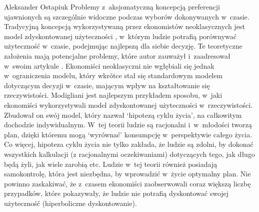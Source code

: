\begin{artplenv}{Aleksander Ostapiuk}
Problemy z~aksjomatyczną koncepcją preferencji ujawnionych są szczególnie widoczne podczas wyborów
dokonywanych w~czasie. Tradycyjną koncepcją wykorzystywaną przez ekonomistów neoklasycznych jest model zdyskontowanej użyteczności
\parencite{samuelson_note_1937},
w~którym ludzie potrafią porównywać użyteczność w~czasie, podejmując
najlepszą dla siebie decyzję. Te teoretyczne założenia mają potencjalne problemy, które autor
zauważył i~zaadresował w~swoim artykule
\parencite{samuelson_note_1937}.
Ekonomiści neoklasyczni nie wgłębiali się jednak w~ograniczenia modelu,
który wkrótce stał się standardowym modelem dotyczącym decyzji w~czasie, mającym wpływ na
kształtowanie się rzeczywistości. Modigliani
\parencite*{modigliani_life_1966}
jest najlepszym przykładem sposobu, w~jaki
ekonomiści wykorzystywali model zdyskontowanej użyteczności w~rzeczywistości. Zbudował on swój model, który nazwał
`hipotezą cyklu życia', na całkowitym dochodzie indywidualnym. W~tej teorii ludzie są racjonalni i~w~młodości tworzą
plan, dzięki któremu mogą `wyrównać' konsumpcję w~perspektywie całego życia. Co więcej, hipoteza cyklu życia nie tylko
zakłada, że ludzie są zdolni, by dokonać wszystkich kalkulacji (z racjonalnymi oczekiwaniami) dotyczących tego, jak
długo będą żyli, jak wiele zarobią etc. Ludzie w~tej teorii również posiadają samokontrolę, która jest niezbędna, by
wprowadzić w~życie optymalny plan. Nie powinno zaskakiwać, że z~czasem ekonomiści zaobserwowali coraz większą liczbę
przypadków, które pokazywały, że ludzie nie potrafią dyskontować swojej użyteczność (hiperboliczne dyskontowanie).

\enlargethispage{.5\baselineskip}


\end{artplenv}
